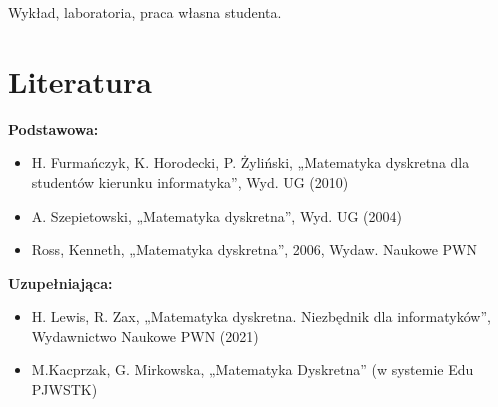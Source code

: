\documentclass[12pt, a4paper]{article}
\begin{document}
Wykład, laboratoria, praca własna studenta.

\section{Literatura}

\textbf{Podstawowa:}
\begin{itemize}
  \item H. Furmańczyk, K. Horodecki, P. Żyliński, „Matematyka dyskretna dla studentów kierunku informatyka”, Wyd. UG (2010)
  \item A. Szepietowski, „Matematyka dyskretna”, Wyd. UG (2004)
  \item Ross, Kenneth, „Matematyka dyskretna”, 2006, Wydaw. Naukowe PWN
\end{itemize}

\textbf{Uzupełniająca:}
\begin{itemize}
  \item H. Lewis, R. Zax, „Matematyka dyskretna. Niezbędnik dla informatyków”, Wydawnictwo Naukowe PWN (2021)
  \item M.Kacprzak, G. Mirkowska, „Matematyka Dyskretna” (w systemie Edu PJWSTK)
\end{itemize}
\end{document}
